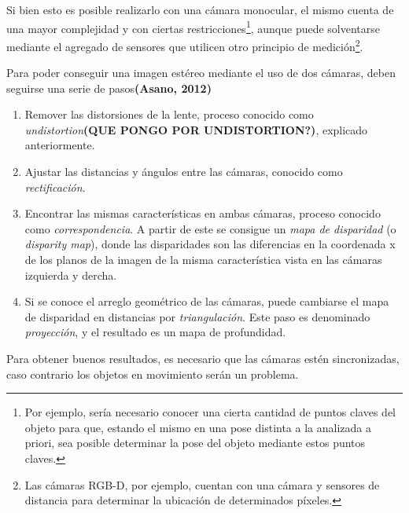 Si bien esto es posible realizarlo con una cámara monocular, el mismo cuenta de una mayor complejidad y con ciertas restricciones\footnote{Por ejemplo, sería necesario conocer una cierta cantidad de puntos claves del objeto para que, estando el mismo en una pose distinta a la analizada a priori, sea posible determinar la pose del objeto mediante estos puntos claves.}, aunque puede solventarse mediante el agregado de sensores que utilicen otro principio de medición\footnote{Las cámaras RGB-D, por ejemplo, cuentan con una cámara y sensores de distancia para determinar la ubicación de determinados píxeles.}.

Para poder conseguir una imagen estéreo mediante el uso de dos cámaras, deben seguirse una serie de pasos\textbf{(Asano, 2012)}
\begin{enumerate}
    \item Remover las distorsiones de la lente, proceso conocido como \textit{undistortion}\textbf{(QUE PONGO POR UNDISTORTION?)}, explicado anteriormente.
    \item Ajustar las distancias y ángulos entre las cámaras, conocido como \textit{rectificación}.
    \item Encontrar las mismas características en ambas cámaras, proceso conocido como \textit{correspondencia}. A partir de este se consigue un \textit{mapa de disparidad} (o \textit{disparity map}), donde las disparidades son las diferencias en la coordenada x de los planos de la imagen de la misma característica vista en las cámaras izquierda y dercha.
    \item Si se conoce el arreglo geométrico de las cámaras, puede cambiarse el mapa de disparidad en distancias por \textit{triangulación}. Este paso es denominado \textit{proyección}, y el resultado es un mapa de profundidad.
\end{enumerate}

Para obtener buenos resultados, es necesario que las cámaras estén sincronizadas, caso contrario los objetos en movimiento serán un problema.

